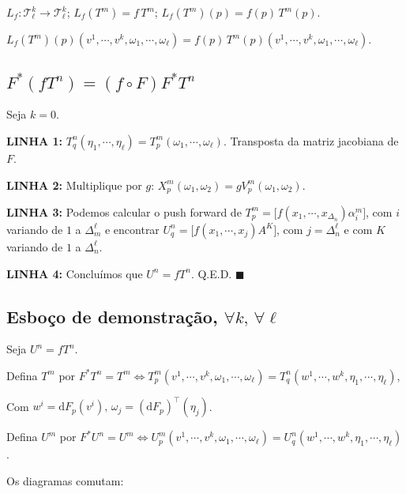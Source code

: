 \documentclass[12pt]{article}
\begin{document}
		$L_f : \mathcal{T}^k_\ell \rightarrow \mathcal{T}^k_\ell$; $L_f(T^m) = f\,T^m$; $L_f(T^m)(p) = f(p)\,T^m(p)$.

		$L_f(T^m)(p)(v^1, \cdots, v^k, \omega_1, \cdots, \omega_\ell) = f(p)\,T^m(p)(v^1, \cdots, v^k, \omega_1, \cdots, \omega_\ell)$.

		\subsection{$F^* (fT^n) = (f \circ F) F^* T^n$}
		\begin{flushright}
		\end{flushright}

		Seja $k = 0$.

		\textbf{LINHA 1:} $T_q^n(\eta_1,\cdots,\eta_\ell) = T_p^m(\omega_1, \cdots, \omega_\ell)$. Transposta da matriz jacobiana de $F$.

		\textbf{LINHA 2:} Multiplique por $g$: $X_p^m(\omega_1, \omega_2) = g V_p^m(\omega_1, \omega_2)$.

		\textbf{LINHA 3:} Podemos calcular o push forward de $T_p^m = \bigg[ f(x_1, \cdots, x_{\Delta_n}) \alpha_i^m \bigg]$, com $i$ variando de $1$ a $\Delta_m^\ell$ e encontrar $U_q^n = \bigg[ f(x_1, \cdots, x_j) A^K \bigg]$, com $j = \Delta_n^\ell$ e com $K$ variando de $1$ a $\Delta_n^\ell$.

		\textbf{LINHA 4:} Conclu\'imos que $U^n = f T^n$. Q.E.D.$\,\,\blacksquare$

		\subsection{Esbo\c{c}o de demonstra\c{c}\~ao, $\forall k,\, \forall \ell$}
		\begin{flushright}
		\end{flushright}

		Seja $U^n = f T^n$.

		Defina $T^m$ por $F^* T^n = T^m \Leftrightarrow T^m_p (v^1, \cdots, v^k, \omega_1, \cdots, \omega_\ell) = T_q^n (w^1, \cdots, w^k, \eta_1, \cdots, \eta_\ell)$,

		Com $w^i = \mathrm{d}F_p(v^i), \,\omega_j = (\mathrm{d}F_p)^\top (\eta_j)$.

		Defina $U^m$ por $F^* U^n = U^m \Leftrightarrow U^m_p (v^1, \cdots, v^k, \omega_1, \cdots, \omega_\ell) = U_q^n (w^1, \cdots, w^k, \eta_1, \cdots, \eta_\ell)$.

		\vspace{3mm}

		Os diagramas comutam:
\end{document}
